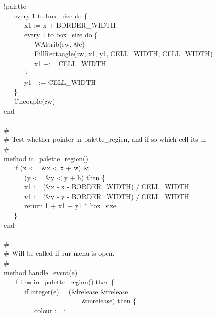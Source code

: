 {{\textbar}{\textbar} !palette \\
\>   \ \ \ every 1 to box\_size do \{ \\
\>   \ \ \ \ \ \ x1 := x + BORDER\_WIDTH \  \\
\>   \ \ \ \ \ \ every 1 to box\_size do \{ \\
\>   \ \ \ \ \ \ \ \ \ WAttrib(cw, @e) \\
\>   \ \ \ \ \ \ \ \ \ FillRectangle(cw, x1, y1, CELL\_WIDTH,
CELL\_WIDTH) \\
\>   \ \ \ \ \ \ \ \ \ x1 +:= CELL\_WIDTH \\
\>   \ \ \ \ \ \ \} \\
\>   \ \ \ \ \ \ y1 +:= CELL\_WIDTH \\
\>   \ \ \ \} \\
\>   \ \ \ Uncouple(cw) \\
\>   end \\
\ \\
\>   \# \\
\>   \# Test whether pointer in palette\_region, and if so which cell it{\textquotesingle}s in \\
\>   \# \\
\>   method in\_palette\_region() \\
\>   \ \ \ if (x {\textless}= \&x {\textless} x + w) \& \\
\>   \ \ \ \ \ \ (y {\textless}= \&y {\textless} y + h)
then \{ \\
\>   \ \ \ \ \ \ x1 := (\&x - x - BORDER\_WIDTH) / CELL\_WIDTH \\
\>   \ \ \ \ \ \ y1 := (\&y - y - BORDER\_WIDTH) / CELL\_WIDTH \\
\>   \ \ \ \ \ \ return 1 + x1 + y1 * box\_size \\
\>   \ \ \ \} \\
\>   end \\
\ \\
\>   \# \\
\>   \# Will be called if our menu is open. \\
\>   \# \\
\>   method handle\_event(e) \\
\>   \ \ \ if i := in\_palette\_region() then \{ \\
\>   \ \ \ \ \ \ if integer(e) = (\&lrelease {\textbar} \&rrelease
{\textbar}  \\
\>   \ \ \ \ \ \ \ \ \ \ \ \ \ \ \ \ \ \ \ \ \ \ \ \&mrelease) then \{ \\
\>   \ \ \ \ \ \ \ \ \ colour := i \\
}
